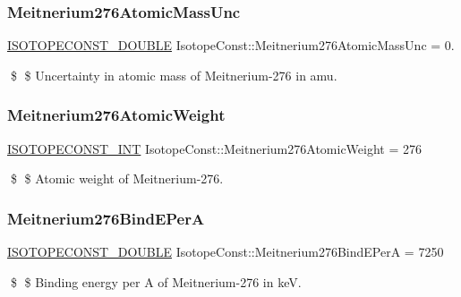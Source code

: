\subsubsection{\texorpdfstring{Meitnerium276\+Atomic\+Mass\+Unc}{Meitnerium276AtomicMassUnc}}
{\footnotesize\ttfamily \mbox{\hyperlink{group___isotope_const-_macros_ga8f45a7272ce02c0b4c65c44636ed719a}{I\+S\+O\+T\+O\+P\+E\+C\+O\+N\+S\+T\+\_\+\+D\+O\+U\+B\+LE}} Isotope\+Const\+::\+Meitnerium276\+Atomic\+Mass\+Unc = 0.}

\$ \$ Uncertainty in atomic mass of Meitnerium-\/276 in amu. \mbox{\label{group___isotope_const-_meitnerium-_mt276_ga57f864defdab4fe69880e9f69bdf8774}} 
\subsubsection{\texorpdfstring{Meitnerium276\+Atomic\+Weight}{Meitnerium276AtomicWeight}}
{\footnotesize\ttfamily \mbox{\hyperlink{group___isotope_const-_macros_ga5f18360b3e99483a35c32d789e62621c}{I\+S\+O\+T\+O\+P\+E\+C\+O\+N\+S\+T\+\_\+\+I\+NT}} Isotope\+Const\+::\+Meitnerium276\+Atomic\+Weight = 276}

\$ \$ Atomic weight of Meitnerium-\/276. \mbox{\label{group___isotope_const-_meitnerium-_mt276_gab8c32dc0c3cb96a9dbd3183dbb9c5179}} 
\subsubsection{\texorpdfstring{Meitnerium276\+Bind\+E\+PerA}{Meitnerium276BindEPerA}}
{\footnotesize\ttfamily \mbox{\hyperlink{group___isotope_const-_macros_ga8f45a7272ce02c0b4c65c44636ed719a}{I\+S\+O\+T\+O\+P\+E\+C\+O\+N\+S\+T\+\_\+\+D\+O\+U\+B\+LE}} Isotope\+Const\+::\+Meitnerium276\+Bind\+E\+PerA = 7250}

\$ \$ Binding energy per A of Meitnerium-\/276 in keV. \mbox{\label{group___isotope_const-_meitnerium-_mt276_ga3d7dc54197226572321b20f74d1328a4}} 
